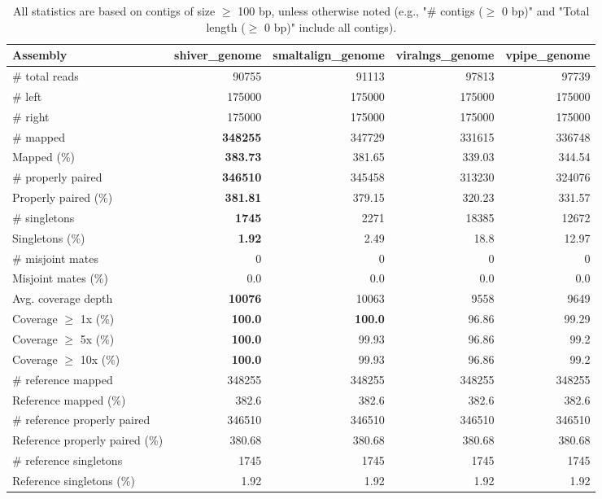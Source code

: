 \documentclass[12pt,a4paper]{article}
\begin{document}
\begin{table}[ht]
\begin{center}
\caption{All statistics are based on contigs of size $\geq$ 100 bp, unless otherwise noted (e.g., "\# contigs ($\geq$ 0 bp)" and "Total length ($\geq$ 0 bp)" include all contigs).}
\begin{tabular}{|l*{4}{|r}|}
\hline
Assembly & shiver\_genome & smaltalign\_genome & viralngs\_genome & vpipe\_genome \\ \hline
\# total reads & 90755 & 91113 & 97813 & 97739 \\ \hline
\# left & 175000 & 175000 & 175000 & 175000 \\ \hline
\# right & 175000 & 175000 & 175000 & 175000 \\ \hline
\# mapped & {\bf 348255} & 347729 & 331615 & 336748 \\ \hline
Mapped (\%) & {\bf 383.73} & 381.65 & 339.03 & 344.54 \\ \hline
\# properly paired & {\bf 346510} & 345458 & 313230 & 324076 \\ \hline
Properly paired (\%) & {\bf 381.81} & 379.15 & 320.23 & 331.57 \\ \hline
\# singletons & {\bf 1745} & 2271 & 18385 & 12672 \\ \hline
Singletons (\%) & {\bf 1.92} & 2.49 & 18.8 & 12.97 \\ \hline
\# misjoint mates & 0 & 0 & 0 & 0 \\ \hline
Misjoint mates (\%) & 0.0 & 0.0 & 0.0 & 0.0 \\ \hline
Avg. coverage depth & {\bf 10076} & 10063 & 9558 & 9649 \\ \hline
Coverage $\geq$ 1x (\%) & {\bf 100.0} & {\bf 100.0} & 96.86 & 99.29 \\ \hline
Coverage $\geq$ 5x (\%) & {\bf 100.0} & 99.93 & 96.86 & 99.2 \\ \hline
Coverage $\geq$ 10x (\%) & {\bf 100.0} & 99.93 & 96.86 & 99.2 \\ \hline
\# reference mapped & 348255 & 348255 & 348255 & 348255 \\ \hline
Reference mapped (\%) & 382.6 & 382.6 & 382.6 & 382.6 \\ \hline
\# reference properly paired & 346510 & 346510 & 346510 & 346510 \\ \hline
Reference properly paired (\%) & 380.68 & 380.68 & 380.68 & 380.68 \\ \hline
\# reference singletons & 1745 & 1745 & 1745 & 1745 \\ \hline
Reference singletons (\%) & 1.92 & 1.92 & 1.92 & 1.92 \\ \hline

\end{tabular}
\end{center}
\end{table}
\end{document}
